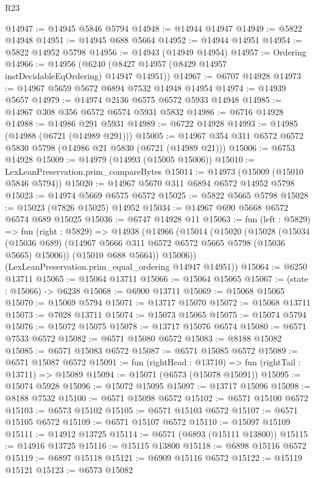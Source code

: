 \begin{lexlean}{R23}
\begin{coremodule}
@14947 := @14945 @5846 @5794
@14948 := @14944 @14947
@14949 := @5822 @14948
@14951 := @14945 @688 @5664
@14952 := @14944 @14951
@14954 := @5822 @14952 @5798
@14956 := @14943 (@14949 @14954)
@14957 := Ordering
@14966 := @14956 (@6240 (@8427 @14957 (@8429 @14957 instDecidableEqOrdering) @14947 @14951))
@14967 := @6707 @14928
@14973 := @14967 @5659 @5672 @6894 @7532 @14948 @14954
@14974 := @14939 @5657
@14979 := @14974 @2136 @6575 @6572 @5933 @14948
@14985 := @14967 @308 @356 @6572 @6574 @5931 @5832
@14986 := @6716 @14928
@14988 := @14986 @291 @5931
@14989 := @6722 @14928
@14993 := @14985 (@14988 (@6721 (@14989 @291)))
@15005 := @14967 @354 @311 @6572 @6572 @5830 @5798 (@14986 @21 @5830 (@6721 (@14989 @21)))
@15006 := @6753 @14928
@15009 := @14979 (@14993 (@15005 @15006))
@15010 := LexLeanPreservation.prim_compareBytes
@15014 := @14973 (@15009 (@15010 @5846 @5794))
@15020 := @14967 @5670 @311 @6894 @6572 @14952 @5798
@15023 := @14974 @5669 @6575 @6572
@15025 := @5822 @5665 @5798
@15028 := @15023 (@7826 @15025) @14952
@15034 := @14967 @690 @5668 @6572 @6574 @689 @15025
@15036 := @6747 @14928 @11
@15063 := fun (left : @5829) =>
  fun (right : @5829) =>
  @14938
    (@14966
      (@15014
        (@15020
          (@15028
            (@15034 (@15036 @689) (@14967 @5666 @311 @6572 @6572 @5665 @5798 (@15036 @5665) @15006))
            (@15010 @688 @5664))
          @15006))
      (LexLeanPreservation.prim_equal_ordering @14947 @14951))
@15064 := @6250 @13711
@15065 := @15064 @13711
@15066 := @15064 @15065
@15067 := (state : @15066) -> @6238
@15068 := @6900 @13711
@15069 := @15068 @15065
@15070 := @15069 @5794
@15071 := @13717 @15070
@15072 := @15068 @13711
@15073 := @7028 @13711
@15074 := @15073 @15065
@15075 := @15074 @5794
@15076 := @15072 @15075
@15078 := @13717 @15076 @6574
@15080 := @6571 @7533 @6572
@15082 := @6571 @15080 @6572
@15083 := @8188 @15082
@15085 := @6571 @15083 @6572
@15087 := @6571 @15085 @6572
@15089 := @6571 @15087 @6572
@15091 := fun (rightHead : @13710) => fun (rightTail : @13711) => @15089
@15094 := @15071 (@6573 (@15078 @15091))
@15095 := @15074 @5928
@15096 := @15072 @15095
@15097 := @13717 @15096
@15098 := @8188 @7532
@15100 := @6571 @15098 @6572
@15102 := @6571 @15100 @6572
@15103 := @6573 @15102
@15105 := @6571 @15103 @6572
@15107 := @6571 @15105 @6572
@15109 := @6571 @15107 @6572
@15110 := @15097 @15109
@15111 := @14912 @13725
@15114 := @6571 (@6893 (@15111 @13800))
@15115 := @14916 @13725
@15116 := @15115 @13800
@15118 := @6898 @15116 @6572
@15119 := @6897 @15118
@15121 := @6909 @15116 @6572
@15122 := @15119 @15121
@15123 := @6573 @15082

\end{coremodule}
\end{lexlean}
